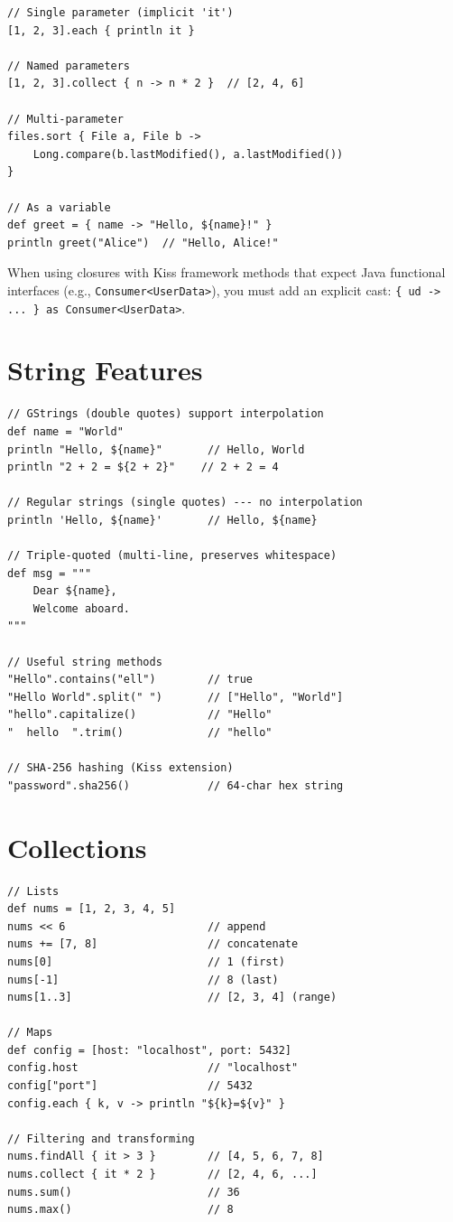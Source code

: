 \begin{lstlisting}[style=groovy]
// Single parameter (implicit 'it')
[1, 2, 3].each { println it }

// Named parameters
[1, 2, 3].collect { n -> n * 2 }  // [2, 4, 6]

// Multi-parameter
files.sort { File a, File b ->
    Long.compare(b.lastModified(), a.lastModified())
}

// As a variable
def greet = { name -> "Hello, ${name}!" }
println greet("Alice")  // "Hello, Alice!"
\end{lstlisting}

\begin{warnbox}
When using closures with Kiss framework methods that expect Java functional interfaces (e.g., \texttt{Consumer<UserData>}), you must add an explicit cast: \texttt{\{ ud -> ... \} as Consumer<UserData>}.
\end{warnbox}

\section{String Features}
\label{sec:gp-strings}

\begin{lstlisting}[style=groovy]
// GStrings (double quotes) support interpolation
def name = "World"
println "Hello, ${name}"       // Hello, World
println "2 + 2 = ${2 + 2}"    // 2 + 2 = 4

// Regular strings (single quotes) --- no interpolation
println 'Hello, ${name}'       // Hello, ${name}

// Triple-quoted (multi-line, preserves whitespace)
def msg = """
    Dear ${name},
    Welcome aboard.
"""

// Useful string methods
"Hello".contains("ell")        // true
"Hello World".split(" ")       // ["Hello", "World"]
"hello".capitalize()           // "Hello"
"  hello  ".trim()             // "hello"

// SHA-256 hashing (Kiss extension)
"password".sha256()            // 64-char hex string
\end{lstlisting}

\section{Collections}
\label{sec:gp-collections}

\begin{lstlisting}[style=groovy]
// Lists
def nums = [1, 2, 3, 4, 5]
nums << 6                      // append
nums += [7, 8]                 // concatenate
nums[0]                        // 1 (first)
nums[-1]                       // 8 (last)
nums[1..3]                     // [2, 3, 4] (range)

// Maps
def config = [host: "localhost", port: 5432]
config.host                    // "localhost"
config["port"]                 // 5432
config.each { k, v -> println "${k}=${v}" }

// Filtering and transforming
nums.findAll { it > 3 }        // [4, 5, 6, 7, 8]
nums.collect { it * 2 }        // [2, 4, 6, ...]
nums.sum()                     // 36
nums.max()                     // 8
\end{lstlisting}

